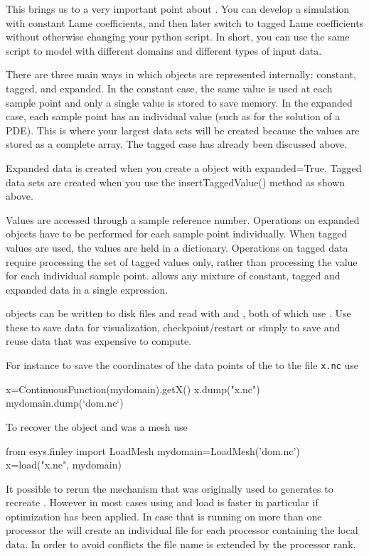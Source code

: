 This brings us to a very important point about \escript.
You can develop a simulation with constant Lame coefficients, and then later switch to tagged
Lame coefficients without otherwise changing your python script.
In short, you can use the same script to model with different domains and different types of input data.

There are three main ways in which \Data objects are represented internally: constant, tagged, and expanded.
In the constant case, the same value is used at each sample point and only a single value is stored to save memory. 
In the expanded case, each sample point has an individual value (such as for the solution of a PDE).
This is where your largest data sets will be created because the values are stored as a complete array.
The tagged case has already been discussed above.

Expanded data is created when you create a \Data object with expanded=True.
Tagged data sets are created when you use the insertTaggedValue() method as shown above.
 
Values are accessed through a sample reference number. Operations on expanded \Data
objects have to be performed for each sample point individually. When tagged values are used, the values are
held in a dictionary. Operations on tagged data require processing the set of tagged values only, rather than 
processing the value for each individual sample point. 
\escript allows any mixture of constant, tagged and expanded data in a single expression.

\Data objects can be written to disk files and read with  and , both of which use \netCDF\cite{NETCDF}.
Use these to save data for visualization, checkpoint/restart or simply to save and reuse data that was expensive to compute.

For instance to save the coordinates of the data points of the
\ContinuousFunction to the file {\tt x.nc} use 
\begin{python}
  x=ContinuousFunction(mydomain).getX()
  x.dump("x.nc")
  mydomain.dump(`dom.nc`)
\end{python}
To recover the object  and  was a \finley mesh use
\begin{python}
  from esys.finley import LoadMesh
  mydomain=LoadMesh('dom.nc')
  x=load("x.nc", mydomain)
\end{python}
It possible to rerun the mechanism that was originally used to generates
 to recreate . However in most cases using  and
load is faster in particular if optimization has been applied. In case that
\escript is running on more than one \MPI processor the  will create an individual file for each processor containing the local data. In order to avoid conflicts the file name is extended by the \MPI processor rank.

